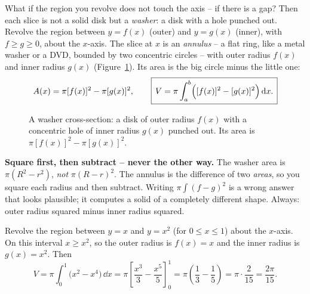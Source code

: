 What if the region you revolve does not touch the axis -- if there is a gap? Then
each slice is not a solid disk but a \emph{washer}: a disk with a hole punched out.
Revolve the region between $y=f(x)$ (outer) and $y=g(x)$ (inner), with
$f \ge g \ge 0$, about the $x$-axis. The slice at $x$ is an \emph{annulus} --
a flat ring, like a metal washer or a DVD, bounded by two concentric circles --
with outer radius $f(x)$ and inner radius $g(x)$ (Figure~\ref{ch26:fig-washer}). Its area is
the big circle minus the little one:
\[
  A(x) = \pi[f(x)]^2 - \pi[g(x)]^2,\qquad
  \boxed{\,V = \pi\int_a^b\Bigl([f(x)]^2 - [g(x)]^2\Bigr)\,\mathrm{d} x.\,}
\]

\begin{figure}[H]
\centering
{}
\caption{A washer cross-section: a disk of outer radius $f(x)$ with a concentric
hole of inner radius $g(x)$ punched out. Its area is $\pi[f(x)]^2 - \pi[g(x)]^2$.}
\label{ch26:fig-washer}
\end{figure}

\begin{trapbox}
\textbf{Square first, then subtract -- never the other way.} The washer area is
$\pi(R^2 - r^2)$, \emph{not} $\pi(R-r)^2$. The annulus is the difference of two
\emph{areas}, so you square each radius and then subtract. Writing
$\pi\int (f-g)^2$ is a wrong answer that looks plausible; it computes a solid of a
completely different shape. Always: outer radius squared minus inner radius
squared.
\end{trapbox}

\begin{example}
\label{ch26:ex-washer}
Revolve the region between $y=x$ and $y=x^2$ (for $0\le x\le 1$) about the
$x$-axis. On this interval $x \ge x^2$, so the outer radius is $f(x)=x$ and the
inner radius is $g(x)=x^2$. Then
\[
  V = \pi\int_0^1\bigl(x^2 - x^4\bigr)\,\dd x
    = \pi\left[\frac{x^3}{3} - \frac{x^5}{5}\right]_0^1
    = \pi\left(\frac13 - \frac15\right)
    = \pi\cdot\frac{2}{15} = \frac{2\pi}{15}.
\]
\end{example}

